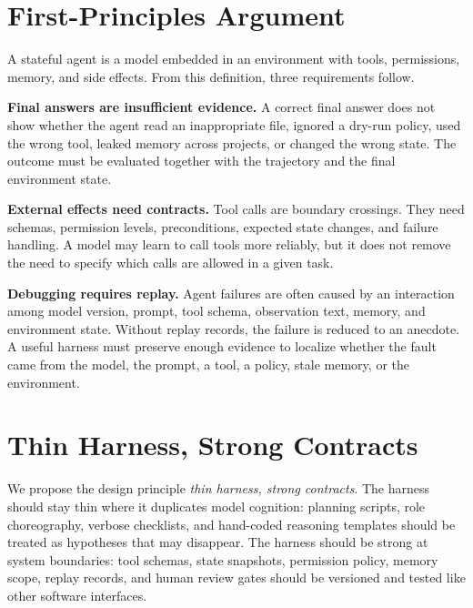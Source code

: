 \documentclass[10pt,conference]{IEEEtran}
\begin{document}
\section{First-Principles Argument}

A stateful agent is a model embedded in an environment with tools, permissions,
memory, and side effects. From this definition, three requirements follow.

\textbf{Final answers are insufficient evidence.} A correct final answer does
not show whether the agent read an inappropriate file, ignored a dry-run
policy, used the wrong tool, leaked memory across projects, or changed the
wrong state. The outcome must be evaluated together with the trajectory and the
final environment state.

\textbf{External effects need contracts.} Tool calls are boundary crossings.
They need schemas, permission levels, preconditions, expected state changes,
and failure handling. A model may learn to call tools more reliably, but it
does not remove the need to specify which calls are allowed in a given task.

\textbf{Debugging requires replay.} Agent failures are often caused by an
interaction among model version, prompt, tool schema, observation text, memory,
and environment state. Without replay records, the failure is reduced to an
anecdote. A useful harness must preserve enough evidence to localize whether
the fault came from the model, the prompt, a tool, a policy, stale memory, or
the environment.

\section{Thin Harness, Strong Contracts}

We propose the design principle \emph{thin harness, strong contracts}. The
harness should stay thin where it duplicates model cognition: planning
scripts, role choreography, verbose checklists, and hand-coded reasoning
templates should be treated as hypotheses that may disappear. The harness
should be strong at system boundaries: tool schemas, state snapshots,
permission policy, memory scope, replay records, and human review gates should
be versioned and tested like other software interfaces.
\end{document}
